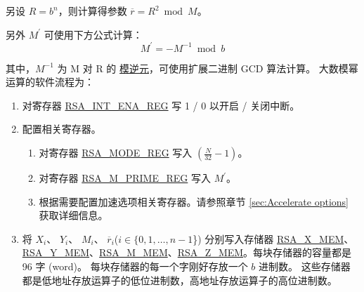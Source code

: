 \documentclass[main\_\_CN.tex]{subfiles}
\begin{document}
另设 \begin{math}R = b^{n}\end{math}，则计算得参数 \begin{math}\overline{r} = R^{2} \bmod M\end{math}。

另外 \begin{math}M^{\prime}\end{math} 可使用下方公式计算：
\[
        M^{\prime} = - M^{-1} \bmod b
\]

其中，$M^{-1}$ 为 M 对 R 的 \href{https://zh.wikipedia.org/wiki/\%E6\%A8\%A1\%E5\%8F\%8D\%E5\%85\%83\%E7\%B4\%A0}{模逆元}，可使用扩展二进制 GCD 算法计算。
大数模幂运算的软件流程为：

\begin{enumerate}

    \item 对寄存器 \hyperref[regdesc:RSAINTENAREG]{RSA\_INT\_ENA\_REG} 写 1 / 0 以开启 / 关闭中断。
    
    \item 配置相关寄存器。    
    
    \begin{enumerate}
        \item 对寄存器 \hyperref[regdesc:RSAMODEREG]{RSA\_MODE\_REG} 写入 \begin{math}( \frac{N}{32} - 1 )\end{math}。
        
        \item 对寄存器 \hyperref[regdesc:RSAMPRIMEREG]{RSA\_M\_PRIME\_REG} 写入 \begin{math}M^{\prime}\end{math}。
      
        \item 根据需要配置加速选项相关寄存器。请参照章节 \ref{sec:Accelerate options} 获取详细信息。   
    \end{enumerate}

    \item 将
        \begin{math}X_{i}\end{math}、
        \begin{math}Y_{i}\end{math}、
        \begin{math}M_{i}\end{math}、
        \begin{math}\overline{r}_{i}\end{math}(\begin{math}i \in \{ 0, 1, \dots, n-1 \end{math}\})
        分别写入存储器 \hyperref[regdesc:RSAmemory]{RSA\_X\_MEM}、\hyperref[regdesc:RSAmemory]{\hyperref[regdesc:RSAmemory]{RSA\_Y\_MEM}}、\hyperref[regdesc:RSAmemory]{RSA\_M\_MEM}、\hyperref[regdesc:RSAmemory]{RSA\_Z\_MEM}。每块存储器的容量都是 96 字 (word)。
        每块存储器的每一个字刚好存放一个 \begin{math}b\end{math} 进制数。
        这些存储器都是低地址存放运算子的低位进制数，高地址存放运算子的高位进制数。
        

\end{enumerate}
\end{document}
